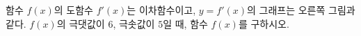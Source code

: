 \noindent\begin{minipage}[t]{0.58\linewidth}\vspace{0pt}\raggedright 함수 $f(x)$의 도함수 $f'(x)$는 이차함수이고, $y=f'(x)$의 그래프는 오른쪽 그림과 같다. $f(x)$의 극댓값이 $6$, 극솟값이 $5$일 때, 함수 $f(x)$를 구하시오.\end{minipage}\hfill\begin{minipage}[t]{0.4\linewidth}\vspace{0pt}\centering \resizebox{\ifdim\width>\linewidth\linewidth\else\width\fi}{!}{}\end{minipage}\par

